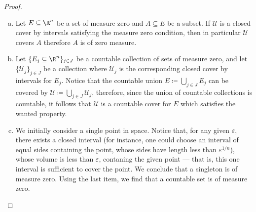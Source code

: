 \begin{proof}
\begin{enumerate}[(a)]\setlength\itemsep{0em}
\item Let \(E \subseteq \R^n\) be a set of measure zero and \(A \subseteq E\) be
  a subset. If \(\mathcal U\) is a closed cover by intervals satisfying the
  measure zero condition, then in particular \(\mathcal U\) covers \(A\)
  therefore \(A\) is of zero measure.

\item Let \(\{E_{j} \subseteq \R^{n}\}_{j \in J}\) be a countable collection of
  sets of measure zero, and let \(\{\mathcal U_{j}\}_{j \in J}\) be a collection
  where \(\mathcal U_j\) is the corresponding closed cover by intervals for
  \(E_j\). Notice that the countable union \(E \coloneq \bigcup_{j \in J} E_j\)
  can be covered by \(\mathcal U \coloneq \bigcup_{j \in J} \mathcal U_j\),
  therefore, since the union of countable collections is countable, it follows
  that \(\mathcal U\) is a countable cover for \(E\) which satisfies the wanted
  property.

\item We initially consider a single point in space. Notice that, for any given
  \(\varepsilon\), there exists a closed interval (for instance, one could
  choose an interval of equal sides containing the point, whose sides have
  length less than \(\varepsilon^{1/n}\)), whose volume is less than
  \(\varepsilon\), contaning the given point --- that is, this one interval is
  sufficient to cover the point. We conclude that a singleton is of measure
  zero. Using the last item, we find that a countable set is of measure zero.


\end{enumerate}
\end{proof}
